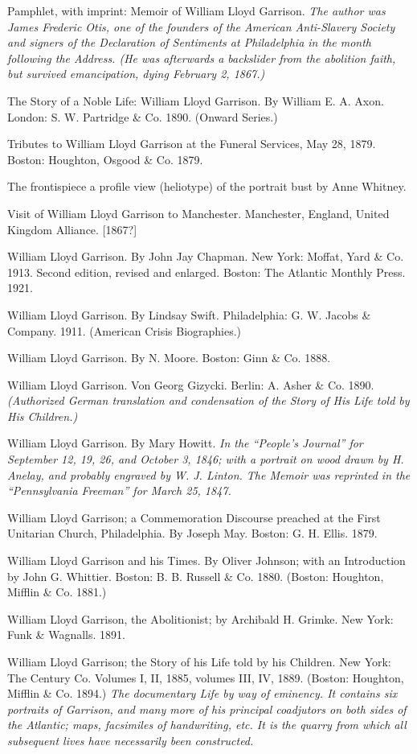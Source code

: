 \documentclass{book}
\begin{document}
Pamphlet, with imprint: Memoir of William Lloyd Garrison. \emph{The author was James Frederic Otis, one of the founders of the American Anti-Slavery Society and signers of the Declaration of Sentiments at Philadelphia in the month following the Address. (He was afterwards a backslider from the abolition faith, but survived emancipation, dying February 2, 1867.)}

The Story of a Noble Life: William Lloyd Garrison. By William E. A. Axon. London: S. W. Partridge \& Co. 1890. (Onward Series.)

Tributes to William Lloyd Garrison at the Funeral Services, May 28, 1879. Boston: Houghton, Osgood \& Co. 1879.

The frontispiece a profile view (heliotype) of the portrait bust by Anne Whitney.

Visit of William Lloyd Garrison to Manchester. Manchester, England, United Kingdom Alliance. {[}1867?{]}

William Lloyd Garrison. By John Jay Chapman. New York: Moffat, Yard \& Co. 1913. Second edition, revised and enlarged. Boston: The Atlantic Monthly Press. 1921.

William Lloyd Garrison. By Lindsay Swift. Philadelphia: G. W. Jacobs \& Company. 1911. (American Crisis Biographies.)

William Lloyd Garrison. By N. Moore. Boston: Ginn \& Co. 1888.

William Lloyd Garrison. Von Georg Gizycki. Berlin: A. Asher \& Co. 1890. \emph{(Authorized German translation and condensation of the Story of His Life told by His Children.)}

William Lloyd Garrison. By Mary Howitt. \emph{In the “People’s Journal” for September 12, 19, 26, and October 3, 1846; with a portrait on wood drawn by H. Anelay, and probably engraved by W. J. Linton. The Memoir was reprinted in the “Pennsylvania Freeman” for March 25, 1847.}

William Lloyd Garrison; a Commemoration Discourse preached at the First Unitarian Church, Philadelphia. By Joseph May. Boston: G. H. Ellis. 1879.

William Lloyd Garrison and his Times. By Oliver Johnson; with an Introduction by John G. Whittier. Boston: B. B. Russell \& Co. 1880. (Boston: Houghton, Mifflin \& Co. 1881.)

William Lloyd Garrison, the Abolitionist; by Archibald H. Grimke. New York: Funk \& Wagnalls. 1891.

William Lloyd Garrison; the Story of his Life told by his Children. New York: The Century Co. Volumes I, II, 1885, volumes III, IV, 1889. (Boston: Houghton, Mifflin \& Co. 1894.) \emph{The documentary Life by way of eminency. It contains six portraits of Garrison, and many more of his principal coadjutors on both sides of the Atlantic; maps, facsimiles of handwriting, etc. It is the quarry from which all subsequent lives have necessarily been constructed.}
\end{document}
